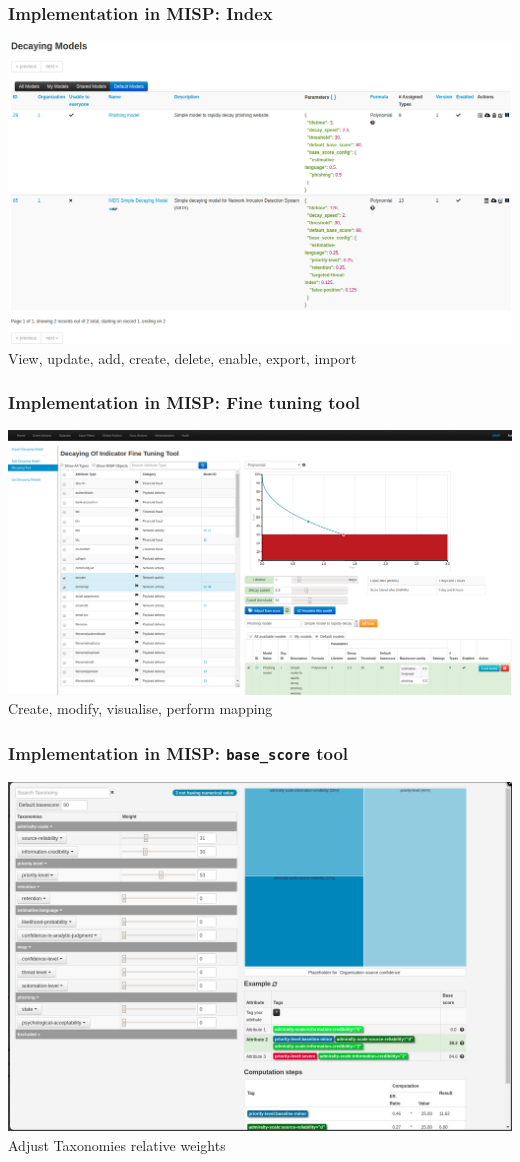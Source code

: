 \begin{frame}
    \frametitle{Implementation in MISP: Index}
    \includegraphics[width=1.00\linewidth]{pics/decaying-index.png}
    View, update, add, create, delete, enable, export, import
\end{frame}

\begin{frame}
    \frametitle{Implementation in MISP: Fine tuning tool}
    \includegraphics[width=1.00\linewidth]{pics/decaying-tool.png}
    Create, modify, visualise, perform mapping
\end{frame}

\begin{frame}
    \frametitle{Implementation in MISP: \texttt{base\_score} tool}
    \includegraphics[width=1.00\linewidth]{pics/decaying-basescore.png}
    Adjust Taxonomies relative weights
\end{frame}

